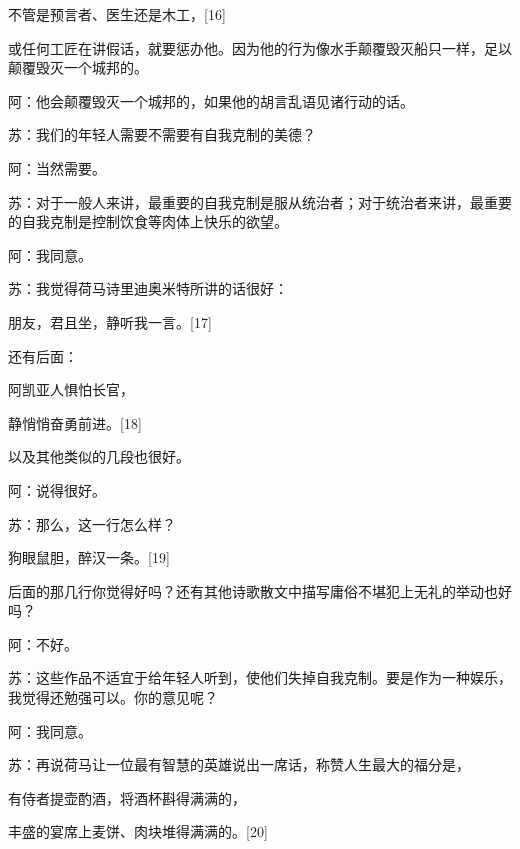 \documentclass[12pt,oneside]{book}
\begin{document}
不管是预言者、医生还是木工，[16]





或任何工匠在讲假话，就要惩办他。因为他的行为像水手颠覆毁灭船只一样，足以颠覆毁灭一个城邦的。

阿：他会颠覆毁灭一个城邦的，如果他的胡言乱语见诸行动的话。

苏：我们的年轻人需要不需要有自我克制的美德？

阿：当然需要。

苏：对于一般人来讲，最重要的自我克制是服从统治者；对于统治者来讲，最重要的自我克制是控制饮食等肉体上快乐的欲望。

阿：我同意。

苏：我觉得荷马诗里迪奥米特所讲的话很好：





朋友，君且坐，静听我一言。[17]





还有后面：





阿凯亚人惧怕长官，

静悄悄奋勇前进。[18]





以及其他类似的几段也很好。

阿：说得很好。

苏：那么，这一行怎么样？





狗眼鼠胆，醉汉一条。[19]





后面的那几行你觉得好吗？还有其他诗歌散文中描写庸俗不堪犯上无礼的举动也好吗？

阿：不好。

苏：这些作品不适宜于给年轻人听到，使他们失掉自我克制。要是作为一种娱乐，我觉得还勉强可以。你的意见呢？

阿：我同意。

苏：再说荷马让一位最有智慧的英雄说出一席话，称赞人生最大的福分是，





有侍者提壶酌酒，将酒杯斟得满满的，

丰盛的宴席上麦饼、肉块堆得满满的。[20]
\end{document}

